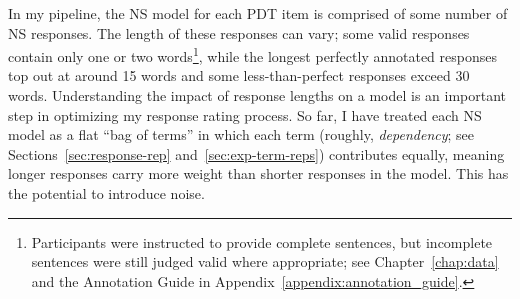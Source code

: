 In my pipeline, the NS model for each PDT item is comprised of some number of NS responses.  The length of these responses can vary; some valid responses contain only one or two words\footnote{Participants were instructed to provide complete sentences, but incomplete sentences were still judged valid where appropriate; see Chapter~\ref{chap:data} and the Annotation Guide in Appendix~\ref{appendix:annotation_guide}.}, while the longest perfectly annotated responses top out at around 15 words and some less-than-perfect responses exceed 30 words. Understanding the impact of response lengths on a model is an important step in optimizing my response rating process. So far, I have treated each NS model as a flat ``bag of terms'' in which each term (roughly, \textit{dependency}; see Sections~\ref{sec:response-rep} and~\ref{sec:exp-term-reps}) contributes equally, meaning longer responses carry more weight than shorter responses in the model. This has the potential to introduce noise. 

